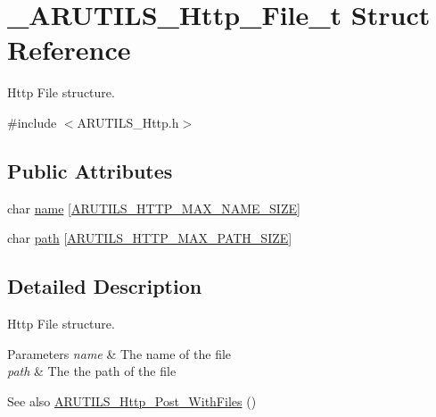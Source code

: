\hypertarget{struct___a_r_u_t_i_l_s___http___file__t}{}\section{\+\_\+\+A\+R\+U\+T\+I\+L\+S\+\_\+\+Http\+\_\+\+File\+\_\+t Struct Reference}
\label{struct___a_r_u_t_i_l_s___http___file__t}


Http File structure.  




{\ttfamily \#include $<$A\+R\+U\+T\+I\+L\+S\+\_\+\+Http.\+h$>$}

\subsection*{Public Attributes}
\begin{DoxyCompactItemize}
\item 
char \hyperlink{struct___a_r_u_t_i_l_s___http___file__t_a497afd15aa4d10b698314d226a03ac4e}{name} \mbox{[}\hyperlink{_a_r_u_t_i_l_s___http_8h_a615d79a50ba9ad7bb9eaaa52d941cceb}{A\+R\+U\+T\+I\+L\+S\+\_\+\+H\+T\+T\+P\+\_\+\+M\+A\+X\+\_\+\+N\+A\+M\+E\+\_\+\+S\+I\+ZE}\mbox{]}
\item 
char \hyperlink{struct___a_r_u_t_i_l_s___http___file__t_a79111cf110b0280ecb3ab027d4a00b5e}{path} \mbox{[}\hyperlink{_a_r_u_t_i_l_s___http_8h_acdf8714741ae215591178f247f4e8fc6}{A\+R\+U\+T\+I\+L\+S\+\_\+\+H\+T\+T\+P\+\_\+\+M\+A\+X\+\_\+\+P\+A\+T\+H\+\_\+\+S\+I\+ZE}\mbox{]}
\end{DoxyCompactItemize}


\subsection{Detailed Description}
Http File structure. 


\begin{DoxyParams}{Parameters}
{\em name} & The name of the file \\
\hline
{\em path} & The the path of the file \\
\hline
\end{DoxyParams}
\begin{DoxySeeAlso}{See also}
\hyperlink{_a_r_u_t_i_l_s___http_8h_a9256c37f739848eb3398a762dee618c9}{A\+R\+U\+T\+I\+L\+S\+\_\+\+Http\+\_\+\+Post\+\_\+\+With\+Files} () 
\end{DoxySeeAlso}


